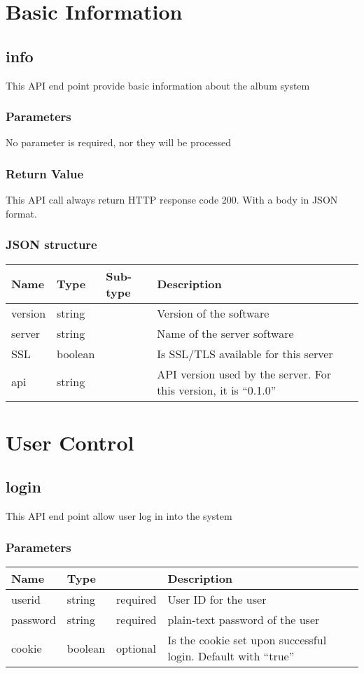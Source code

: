 \documentclass[a4paper,12pt]{report}
\begin{document}
	\chapter{Basic Information}
	\section{info}
	This API end point provide basic information about the album system
	\subsection{Parameters}
	No parameter is required, nor they will be processed
	\subsection{Return Value}
	This API call always return HTTP response code 200. With a body in JSON format.
	\subsection{JSON structure}
	\begin{tabular}{|l|l|l|p{10cm}|}
		\hline
		Name & Type & Sub-type & Description\\\hline
		version & string & & Version of the software\\\hline
		server & string & & Name of the server software\\\hline
		SSL & boolean & & Is SSL/TLS available for this server\\\hline
		api & string & & API version used by the server. For this version, it is ``0.1.0''\\\hline
	\end{tabular}
	\chapter{User Control}
	\section{login}
	This API end point allow user log in into the system
	\subsection{Parameters}
	\begin{tabular}{|l|ll|p{10cm}|}
		\hline
		Name & Type & & Description\\\hline
		userid & string & required & User ID for the user\\\hline
		password & string & required & plain-text password of the user\\\hline
		cookie & boolean & optional & 	Is the cookie set upon successful login.\newline
										Default with ``true''\\\hline
	\end{tabular}
\end{document}
